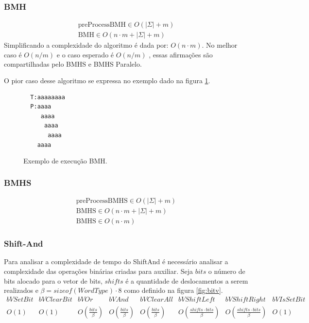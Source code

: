 \documentclass[11pt]{article}
\begin{document}
\subsubsection{BMH}
\label{sec:org1ada3f8}

\begin{equation}
\begin{aligned}
\text{preProcessBMH} \in O(|\Sigma|+m)\\
\text{BMH} \in O(n\cdot m+|\Sigma|+m)
\end{aligned}
\end{equation}
Simplificando a complexidade do algoritmo é dada por: \(O(n\cdot m)\). No melhor caso é \(O(n/m)\) e o caso esperado é \(O(n/m)\) \cite{galil79_improv_worst_case_runnin_time}, essas afirmações são compartilhadas pelo BMHS e BMHS Paralelo.

O pior caso desse algoritmo se expressa no exemplo dado na figura \ref{fig:exemplobmh}.

\begin{figure}
\centering
\begin{BVerbatim}
  T:aaaaaaaa
  P:aaaa
     aaaa
      aaaa
       aaaa
	aaaa
\end{BVerbatim}
\caption{Exemplo de execução BMH.}\label{fig:exemplobmh}
\end{figure}


\subsubsection{BMHS}
\label{sec:orga41f1c2}
\begin{equation}
\begin{aligned}
\text{preProcessBMHS} \in O(|\Sigma|+m)\\
\text{BMHS} \in O(n\cdot m+|\Sigma|+m)\\
\text{BMHS} \in O(n\cdot m)
\end{aligned}
\end{equation}

\subsubsection{Shift-And}
\label{sec:org3629f1e}
Para analisar a complexidade de tempo do ShiftAnd é necessário analisar a complexidade das operações binárias criadas para auxiliar. Seja \(bits\) o número de bits alocado para o vetor de bits, \(shifts\) é a quantidade de deslocamentos a serem realizados e \(\beta = sizeof(WordType)\cdot 8\) como definido na figura \ref{fig:bitv}.
\[
\begin{array}{cccccccc}
\hline bVSetBit & bVClearBit & bVOr & bVAnd & bVClearAll & bVShiftLeft & bVShiftRight & bVIsSetBit \\
\hline O(1) & O(1) & O(\frac{bits}{\beta}) & O(\frac{bits}{\beta}) & O(\frac{bits}{\beta}) & O(\frac{shifts\cdot bits}{\beta}) & O(\frac{shifts\cdot bits}{\beta}) & O(1) \\
\end{array}
\]
\end{document}

